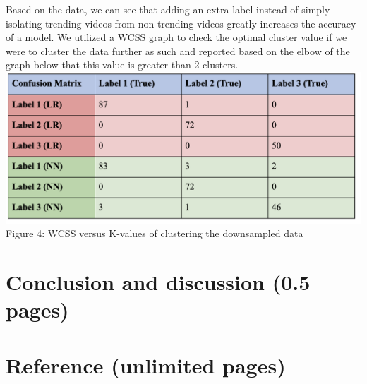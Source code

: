\documentclass{article}
\begin{document}
Based on the data, we can see that adding an extra label instead of simply isolating trending videos from non-trending videos greatly increases the accuracy of a model. We utilized a WCSS graph to check the optimal cluster value if we were to cluster the data further as such and reported based on the elbow of the graph below that this value is greater than 2 clusters.\\

\includegraphics[scale=.4]{chart7.png}\\

Figure 4: WCSS versus K-values of clustering the downsampled data
\section*{Conclusion and discussion (0.5 pages)}
\section*{Reference (unlimited pages)}
\end{document}

